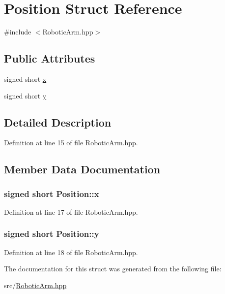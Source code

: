 \hypertarget{struct_position}{}\section{Position Struct Reference}
\label{struct_position}


{\ttfamily \#include $<$Robotic\+Arm.\+hpp$>$}

\subsection*{Public Attributes}
\begin{DoxyCompactItemize}
\item 
signed short \hyperlink{struct_position_adc361e626c67cea59acb23d44342f058}{x}
\item 
signed short \hyperlink{struct_position_aa5bf8323a4761d97b7fdd9011df71f85}{y}
\end{DoxyCompactItemize}


\subsection{Detailed Description}


Definition at line 15 of file Robotic\+Arm.\+hpp.



\subsection{Member Data Documentation}
\subsubsection[{\texorpdfstring{x}{x}}]{\setlength{\rightskip}{0pt plus 5cm}signed short Position\+::x}\hypertarget{struct_position_adc361e626c67cea59acb23d44342f058}{}\label{struct_position_adc361e626c67cea59acb23d44342f058}


Definition at line 17 of file Robotic\+Arm.\+hpp.

\subsubsection[{\texorpdfstring{y}{y}}]{\setlength{\rightskip}{0pt plus 5cm}signed short Position\+::y}\hypertarget{struct_position_aa5bf8323a4761d97b7fdd9011df71f85}{}\label{struct_position_aa5bf8323a4761d97b7fdd9011df71f85}


Definition at line 18 of file Robotic\+Arm.\+hpp.



The documentation for this struct was generated from the following file\+:\begin{DoxyCompactItemize}
\item 
src/\hyperlink{_robotic_arm_8hpp}{Robotic\+Arm.\+hpp}\end{DoxyCompactItemize}
